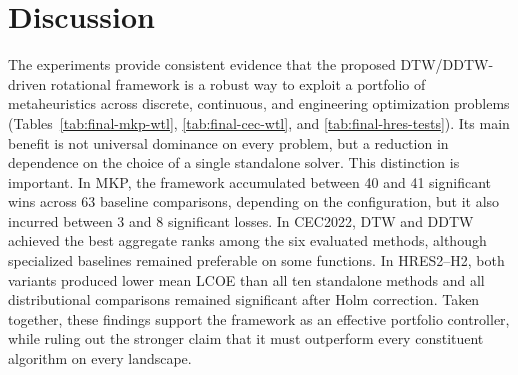 
\section{Discussion}
\label{sec:discussion-final}

The experiments provide consistent evidence that the proposed
DTW/DDTW-driven rotational framework is a robust way to exploit a portfolio of
metaheuristics across discrete, continuous, and engineering optimization
problems (Tables~\ref{tab:final-mkp-wtl}, \ref{tab:final-cec-wtl}, and
\ref{tab:final-hres-tests}). Its main benefit is not universal dominance on every problem, but a
reduction in dependence on the choice of a single standalone solver. This
distinction is important. In MKP, the framework accumulated between 40 and 41
significant wins across 63 baseline comparisons, depending on the
configuration, but it also incurred between 3 and 8 significant losses. In
CEC2022, DTW and DDTW achieved the best aggregate ranks among the six evaluated
methods, although specialized baselines remained preferable on some functions.
In HRES2--H2, both variants produced lower mean LCOE than all ten standalone
methods and all distributional comparisons remained significant after Holm
correction. Taken together, these findings support the framework as an
effective portfolio controller, while ruling out the stronger claim that it
must outperform every constituent algorithm on every landscape.

